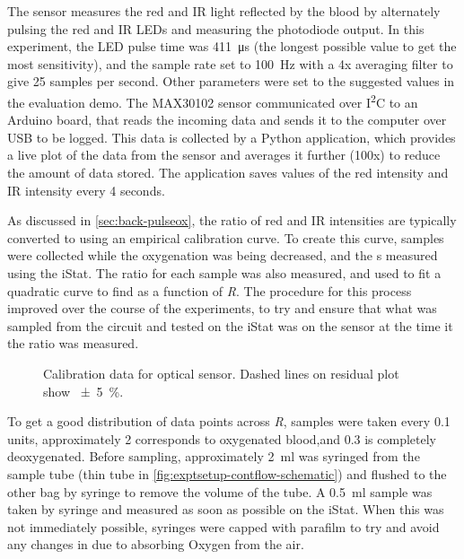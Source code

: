 The sensor measures the red and IR light reflected by the blood by alternately pulsing the red and IR LEDs and measuring the photodiode output.
In this experiment, the LED pulse time was \SI{411}{\micro\second} (the longest possible value to get the most sensitivity), and the sample rate set to \SI{100}{Hz} with a 4x averaging filter to give 25 samples per second.
Other parameters were set to the suggested values in the evaluation demo.
The MAX30102 sensor communicated over I\textsuperscript{2}C to an Arduino board, that reads the incoming data and sends it to the computer over USB to be logged.
This data is collected by a Python application, which provides a live plot of the data from the sensor and averages it further (100x) to reduce the amount of data stored.
The application saves values of the red intensity and IR intensity every 4 seconds.

As discussed in \autoref{sec:back-pulseox}, the ratio of red and IR intensities are typically converted to \SOtwo using an empirical calibration curve.
To create this curve, samples were collected while the oxygenation was being decreased, and the \SOtwo{}s measured using the iStat.
The ratio for each sample was also measured, and used to fit a quadratic curve to find \SOtwo as a function of \textit{R}.
The procedure for this process improved over the course of the experiments, to try and ensure that what was sampled from the circuit and tested on the iStat was on the sensor at the time it the ratio was measured.
\begin{figure}[t]
\centering
{}
\caption[Calibration data for optical \SOtwo sensor]{Calibration data for optical \SOtwo sensor. Dashed lines on residual plot show \SI{\pm5}{\percent}.}
\label{fig:exptsetup-oximetercal}
\end{figure}
To get a good distribution of data points across \textit{R}, samples were taken every 0.1 units, approximately 2 corresponds to oxygenated blood,and 0.3 is completely deoxygenated.
Before sampling, approximately \SI{2}{ml} was syringed from the sample tube (thin tube in \autoref{fig:exptsetup-contflow-schematic}) and flushed to the other bag by syringe to remove the volume of the tube.
A \SI{0.5}{ml} sample was taken by syringe and measured as soon as possible on the iStat.
When this was not immediately possible, syringes were capped with parafilm to try and avoid any changes in \SOtwo due to absorbing Oxygen from the air.

